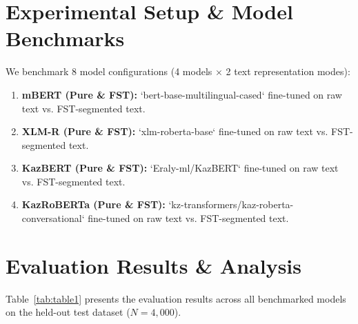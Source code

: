 \documentclass[runningheads]{llncs}
\begin{document}
\section{Experimental Setup \& Model Benchmarks}
We benchmark 8 model configurations (4 models $\times$ 2 text representation modes):
\begin{enumerate}
\item \textbf{mBERT (Pure \& FST):} `bert-base-multilingual-cased` fine-tuned on raw text vs. FST-segmented text.
\item \textbf{XLM-R (Pure \& FST):} `xlm-roberta-base` fine-tuned on raw text vs. FST-segmented text.
\item \textbf{KazBERT (Pure \& FST):} `Eraly-ml/KazBERT` fine-tuned on raw text vs. FST-segmented text.
\item \textbf{KazRoBERTa (Pure \& FST):} `kz-transformers/kaz-roberta-conversational` fine-tuned on raw text vs. FST-segmented text.
\end{enumerate}

\section{Evaluation Results \& Analysis}
Table~\ref{tab:table1} presents the evaluation results across all benchmarked models on the held-out test dataset ($N = 4,000$).

\begin{table}[htbp]
\caption{Complete Evaluation Results (Pure vs. FST-Boosted Models)}
\label{tab:table1}
\centering
{}
\end{table}
\end{document}
